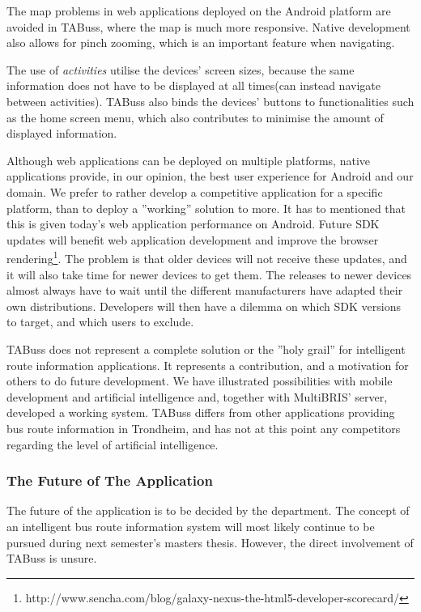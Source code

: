 The map problems in web applications deployed on the Android platform are avoided in TABuss, where the map is much more responsive. Native development also allows for pinch zooming, which is an important feature when navigating. 

The use of \emph{activities} utilise the devices' screen sizes, because the same information does not have to be displayed at all times(can instead navigate between activities). TABuss also binds the devices' buttons to functionalities such as the home screen menu, which also contributes to minimise the amount of displayed information.

Although web applications can be deployed on multiple platforms, native applications provide, in our opinion, the best user experience for Android and our domain. We prefer to rather develop a competitive application for a specific platform, than to deploy a ''working'' solution to more. It has to mentioned that this is given today's web application performance on Android. Future SDK updates will benefit web application development and improve the browser rendering\footnote{http://www.sencha.com/blog/galaxy-nexus-the-html5-developer-scorecard/}. The problem is that older devices will not receive these updates, and it will also take time for newer devices to get them. The releases to newer devices almost always have to wait until the different manufacturers have adapted their own distributions. Developers will then have a dilemma on which SDK versions to target, and which users to exclude.

TABuss does not represent a complete solution or the ''holy grail'' for intelligent route information applications. It represents a contribution, and a motivation for others to do future development. We have illustrated possibilities with mobile development and artificial intelligence and, together with MultiBRIS' server\cite{multibris}, developed a working system. TABuss differs from other applications providing bus route information in Trondheim, and has not at this point any competitors regarding the level of artificial intelligence.


\subsubsection{The Future of The Application}
The future of the application is to be decided by the department. The concept of an intelligent bus route information system will most likely continue to be pursued during next semester's masters thesis. However, the direct involvement of TABuss is unsure.

